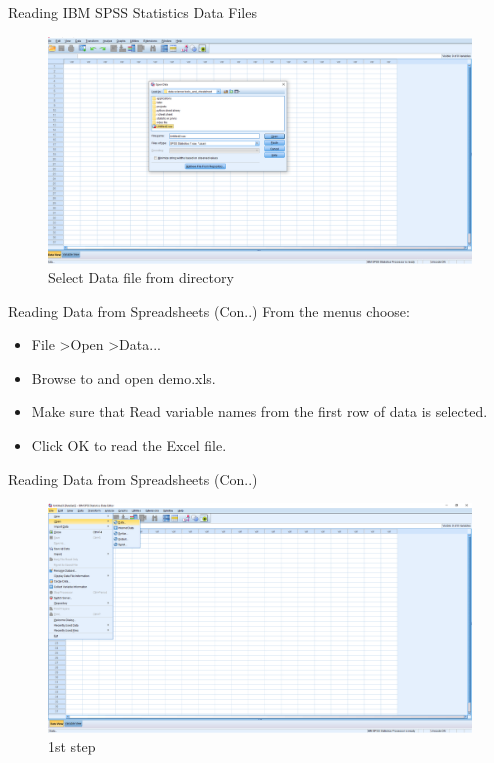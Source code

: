 \begin{frame}[t]{Reading IBM SPSS Statistics Data Files}
	\begin{figure}
		\centering
		\includegraphics[width=12cm]{img/sav_data_2}
		\caption{Select Data file from directory}
	\end{figure}
\end{frame}
\begin{frame}[t]{Reading Data from Spreadsheets (Con..)}
	From the menus choose:\\
	\begin{itemize}
		\item 	File \textgreater Open \textgreater Data...\\
		\item Browse to and open demo.xls.\\
		\item Make sure that Read variable names from the first row of data is selected.\\
		\item Click OK to read the Excel file.\\
	\end{itemize}
\end{frame}
\begin{frame}[t]{Reading Data from Spreadsheets (Con..)}
	\begin{figure}
		\centering
		\includegraphics[width=12cm]{img/sav_data_1}
		\caption{1st step}
	\end{figure}
\end{frame}
